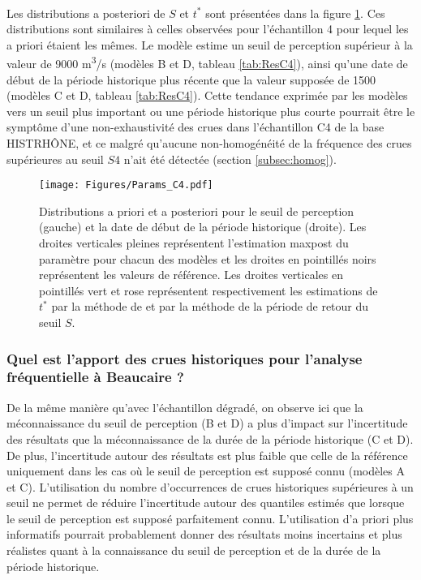 \documentclass[11pt]{article}
\begin{document}
	\paragraph{} Les distributions a posteriori de $S$ et $t^{*}$ sont présentées dans la figure \ref{fig:Params_C4}. Ces distributions sont similaires à celles observées pour l'échantillon 4 pour lequel les a priori étaient les mêmes. Le modèle estime un seuil de perception supérieur à la valeur de 9000 m\textsuperscript{3}/s (modèles B et D, tableau \ref{tab:ResC4}), ainsi qu'une date de début de la période historique plus récente que la valeur supposée de 1500 (modèles C et D, tableau \ref{tab:ResC4}). Cette tendance exprimée par les modèles vers un seuil plus important ou une période historique plus courte pourrait être le symptôme d'une non-exhaustivité des crues dans l'échantillon C4 de la base HISTRHÔNE, et ce malgré qu'aucune non-homogénéité de la fréquence des crues supérieures au seuil $S4$ n'ait été détectée (section \ref{subsec:homog}).
	
	\begin{figure}[h]
		\centering
		\texttt{[image: Figures/Params\_C4.pdf]}	
		\caption{Distributions a priori et a posteriori pour le seuil de perception (gauche) et la date de début de la période historique (droite). Les droites verticales pleines représentent l'estimation maxpost du paramètre pour chacun des modèles et les droites en pointillés noirs représentent les valeurs de référence. Les droites verticales en pointillés vert et rose représentent respectivement les estimations de $t^{*}$ par la méthode de \citet{prosdocimi_german_2018} et par la méthode de la période de retour du seuil $S$.}
		\label{fig:Params_C4}
	\end{figure}

		\subsubsection{Quel est l'apport des crues historiques pour l'analyse fréquentielle à Beaucaire ?}

	 De la même manière qu'avec l'échantillon dégradé, on observe ici que la méconnaissance du seuil de perception (B et D) a plus d'impact sur l'incertitude des résultats que la méconnaissance de la durée de la période historique (C et D). De plus, l'incertitude autour des résultats est plus faible que celle de la référence uniquement dans les cas où le seuil de perception est supposé connu (modèles A et C). L'utilisation du nombre d'occurrences de crues historiques supérieures à un seuil ne permet de réduire l'incertitude autour des quantiles estimés que lorsque le seuil de perception est supposé parfaitement connu. L'utilisation d'a priori plus informatifs pourrait probablement donner des résultats moins incertains et plus réalistes quant à la connaissance du seuil de perception et de la durée de la période historique.
	 
\end{document}
